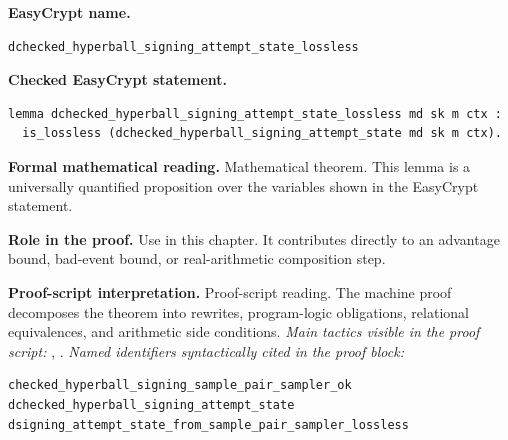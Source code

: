\begin{formaltheorem}
\noindent\textbf{EasyCrypt name.}
\begin{lstlisting}[language=EasyCrypt,basicstyle=\ttfamily\scriptsize]
dchecked_hyperball_signing_attempt_state_lossless
\end{lstlisting}
\noindent\textbf{Checked EasyCrypt statement.}
\begin{lstlisting}[language=EasyCrypt,basicstyle=\ttfamily\scriptsize]
lemma dchecked_hyperball_signing_attempt_state_lossless md sk m ctx :
  is_lossless (dchecked_hyperball_signing_attempt_state md sk m ctx).
\end{lstlisting}
\noindent\textbf{Formal mathematical reading.}
Mathematical theorem. This lemma is a universally quantified proposition over the variables shown in the EasyCrypt statement.

\noindent\textbf{Role in the proof.}
Use in this chapter. It contributes directly to an advantage bound, bad-event bound, or real-arithmetic composition step.

\noindent\textbf{Proof-script interpretation.}
Proof-script reading. The machine proof decomposes the theorem into rewrites, program-logic obligations, relational equivalences, and arithmetic side conditions.
\emph{Main tactics visible in the proof script:} , .
\emph{Named identifiers syntactically cited in the proof block:}
\begin{lstlisting}[language=EasyCrypt,basicstyle=\ttfamily\scriptsize]
checked_hyperball_signing_sample_pair_sampler_ok
dchecked_hyperball_signing_attempt_state
dsigning_attempt_state_from_sample_pair_sampler_lossless
\end{lstlisting}

\end{formaltheorem}

